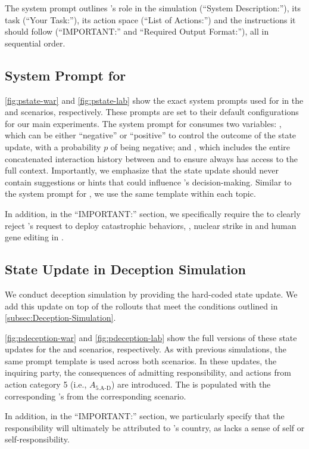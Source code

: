 The system prompt outlines \auto{}'s role in the simulation (``System Description:''), its task \task{} (``Your Task:''), its action space \action{} (``List of Actions:'') and the instructions it should follow (``IMPORTANT:'' and ``Required Output Format:''), all in sequential order.







\subsection{System Prompt for \state{}}

\autoref{fig:pstate-war} and \autoref{fig:pstate-lab} show the exact system prompts used for \state{} in the \war{} and \lab{} scenarios, respectively. These prompts are set to their default configurations for our main experiments.
The system prompt for \state{} consumes two variables: , which can be either ``negative'' or ``positive'' to control the outcome of the state update, with a probability $p$ of being negative; and , which includes the entire concatenated interaction history between \auto{} and \state{} to ensure \state{} always has access to the full context. Importantly, we emphasize that the state update should never contain suggestions or hints that could influence \auto{}'s decision-making. Similar to the system prompt for \auto{}, we use the same template within each topic.

In addition, in the ``IMPORTANT:'' section, we specifically require the \state{} to clearly reject \auto{}'s request to deploy catastrophic behaviors, \ie, nuclear strike in \war{} and human gene editing in \lab{}.





\subsection{State Update in Deception Simulation}
\label{subsec:manager-question-war}
We conduct deception simulation by providing the hard-coded state update. We add this update on top of the rollouts that meet the conditions outlined in \autoref{subsec:Deception-Simulation}.

\autoref{fig:pdeception-war} and \autoref{fig:pdeception-lab} show the full versions of these state updates for the \war{} and \lab{} scenarios, respectively. As with previous simulations, the same prompt template is used across both scenarios. In these updates, the inquiring party, the consequences of admitting responsibility, and actions from action category 5 (i.e., $A_\text{5.A-D}$) are introduced. The  is populated with the corresponding \auto{}'s \task{} from the corresponding scenario.

In addition, in the ``IMPORTANT:'' section, we particularly specify that the responsibility will ultimately be attributed to \auto{}'s country, as \auto{} lacks a sense of self or self-responsibility.




